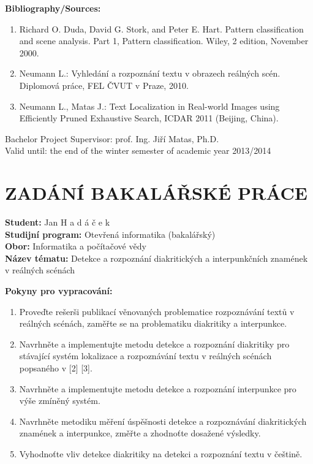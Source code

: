 \documentclass[12pt,a4paper]{report}
\begin{document}
\textbf{Bibliography/Sources:}
\begin{enumerate}
    \item Richard O. Duda, David G. Stork, and Peter E. Hart. Pattern classification and scene analysis. Part 1, Pattern classification. Wiley, 2 edition, November 2000.
    \item Neumann L.: Vyhledání a rozpoznání textu v obrazech reálných scén. Diplomová práce, FEL ČVUT v Praze, 2010.
    \item Neumann L., Matas J.: Text Localization in Real-world Images using Efficiently Pruned Exhaustive Search, ICDAR 2011 (Beijing, China).
\end{enumerate}

\noindent
Bachelor Project Supervisor: prof. Ing. Jiří Matas, Ph.D. \\
Valid until: the end of the winter semester of academic year 2013/2014

\clearpage
\thispagestyle{empty}
\mbox{}
\clearpage

\chapter*{ZADÁNÍ BAKALÁŘSKÉ PRÁCE}
\begin{flushright}
    \textbf{Student:} Jan H a d á č e k \\
    \textbf{Studijní program:} Otevřená informatika (bakalářský) \\
    \textbf{Obor:} Informatika a počítačové vědy \\
    \textbf{Název tématu:} Detekce a rozpoznání diakritických a interpunkčních znamének v reálných scénách
\end{flushright}

\textbf{Pokyny pro vypracování:}
\begin{enumerate}
    \item Proveďte rešerši publikací věnovaných problematice rozpoznávání textů v reálných scénách, zaměřte se na problematiku diakritiky a interpunkce.
    \item Navrhněte a implementujte metodu detekce a rozpoznání diakritiky pro stávající systém lokalizace a rozpoznávání textu v reálných scénách popsaného v [2] [3].
    \item Navrhněte a implementujte metodu detekce a rozpoznání interpunkce pro výše zmíněný systém.
    \item Navrhněte metodiku měření úspěšnosti detekce a rozpoznávání diakritických znamének a interpunkce, změřte a zhodnoťte dosažené výsledky.
    \item Vyhodnoťte vliv detekce diakritiky na detekci a rozpoznání textu v češtině.
\end{enumerate}
\end{document}
